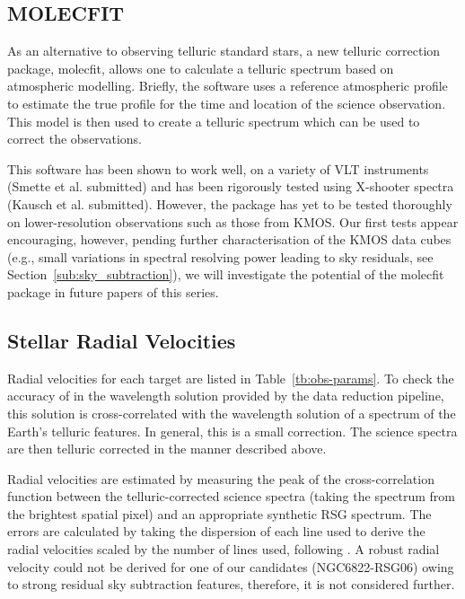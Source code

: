 
\subsection{MOLECFIT} %
\label{sub:molecfit}

As an alternative to observing telluric standard stars, a new telluric correction package, {\sc molecfit}, allows one to calculate a telluric spectrum based on atmospheric modelling.
Briefly, the software uses a reference atmospheric profile to estimate the true profile for the time and location of the science observation.
This model is then used to create a telluric spectrum which can be used to correct the observations.

This software has been shown to work well, on a variety of VLT instruments
(Smette et al. submitted) and has been rigorously tested using X-shooter spectra
(Kausch et al. submitted).
However, the package has yet to be tested thoroughly on lower-resolution observations such as those from KMOS.
Our first tests appear encouraging, however, pending further characterisation of the KMOS data cubes
(e.g., small variations in spectral resolving power leading to sky residuals,
see Section~\ref{sub:sky_subtraction}),
we will investigate the potential of the {\sc molecfit} package in future papers of this series.


\subsection{Stellar Radial Velocities} %
\label{sub:RVs}


Radial velocities for each target are listed in Table~\ref{tb:obs-params}.
To check the accuracy of in the wavelength solution provided by the data reduction pipeline,
this solution is cross-correlated with the wavelength solution of a spectrum of the Earth's telluric features\footnotemark[1].
In general, this is a small correction.
The science spectra are then telluric corrected in the manner described above.


Radial velocities are estimated by measuring the peak of the cross-correlation function between the telluric-corrected science spectra
(taking the spectrum from the brightest spatial pixel)
and an appropriate synthetic RSG spectrum.
The errors are calculated by taking the dispersion of each line used to derive the radial velocities scaled by the number of lines used, following
\cite{2015ApJ...798...23L}.
A robust radial velocity could not be derived for one of our candidates
(NGC6822-RSG06) owing to strong residual sky subtraction features, therefore,
it is not considered further.

